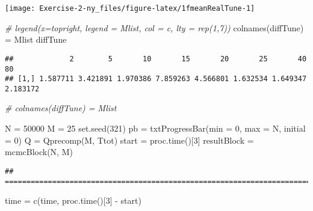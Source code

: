 \documentclass[
]{article}
\newenvironment{Shaded}{\begin{snugshade}}{\end{snugshade}}
\newcommand{\AttributeTok}[1]{\textcolor[rgb]{0.77,0.63,0.00}{#1}}
\newcommand{\CommentTok}[1]{\textcolor[rgb]{0.56,0.35,0.01}{\textit{#1}}}
\newcommand{\DecValTok}[1]{\textcolor[rgb]{0.00,0.00,0.81}{#1}}
\newcommand{\FunctionTok}[1]{\textcolor[rgb]{0.00,0.00,0.00}{#1}}
\newcommand{\NormalTok}[1]{#1}
\newcommand{\OtherTok}[1]{\textcolor[rgb]{0.56,0.35,0.01}{#1}}
\newcommand{\SpecialCharTok}[1]{\textcolor[rgb]{0.00,0.00,0.00}{#1}}
\begin{document}
\begin{center}\texttt{[image: Exercise-2-ny\_files/figure-latex/1fmeanRealTune-1]} \end{center}

\begin{Shaded}
\begin{Highlighting}[]
\CommentTok{\# legend(x=\textquotesingle{}topright\textquotesingle{}, legend = Mlist, col = c, lty = rep(1,7))}
\FunctionTok{colnames}\NormalTok{(diffTune) }\OtherTok{=}\NormalTok{ Mlist}
\NormalTok{diffTune}
\end{Highlighting}
\end{Shaded}

\begin{verbatim}
##             2        5       10       15       20       25       40       80
## [1,] 1.587711 3.421891 1.970386 7.859263 4.566801 1.632534 1.649347 2.183172
\end{verbatim}

\begin{Shaded}
\begin{Highlighting}[]
\CommentTok{\# colnames(diffTune) = Mlist}
\end{Highlighting}
\end{Shaded}

\begin{Shaded}
\begin{Highlighting}[]
\NormalTok{N }\OtherTok{=} \DecValTok{50000}
\NormalTok{M }\OtherTok{=} \DecValTok{25}
\FunctionTok{set.seed}\NormalTok{(}\DecValTok{321}\NormalTok{)}
\NormalTok{pb }\OtherTok{=} \FunctionTok{txtProgressBar}\NormalTok{(}\AttributeTok{min =} \DecValTok{0}\NormalTok{, }\AttributeTok{max =}\NormalTok{ N, }\AttributeTok{initial =} \DecValTok{0}\NormalTok{)}
\NormalTok{Q }\OtherTok{=} \FunctionTok{Qprecomp}\NormalTok{(M, Ttot)}
\NormalTok{start }\OtherTok{=} \FunctionTok{proc.time}\NormalTok{()[}\DecValTok{3}\NormalTok{]}
\NormalTok{resultBlock }\OtherTok{=} \FunctionTok{mcmcBlock}\NormalTok{(N, M)}
\end{Highlighting}
\end{Shaded}

\begin{verbatim}
## ================================================================================
\end{verbatim}

\begin{Shaded}
\begin{Highlighting}[]
\NormalTok{time }\OtherTok{=} \FunctionTok{c}\NormalTok{(time, }\FunctionTok{proc.time}\NormalTok{()[}\DecValTok{3}\NormalTok{] }\SpecialCharTok{{-}}\NormalTok{ start)}
\end{Highlighting}
\end{Shaded}
\end{document}
